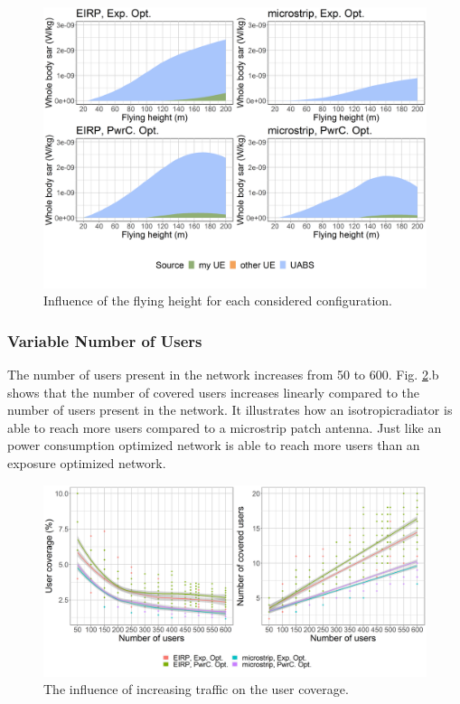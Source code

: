 \documentclass[twocolumn]{phdsymp} %
\begin{document}
\begin{figure}[h!]
\centering
  \includegraphics[width=\linewidth]{s2/fhFourSources.png}
  \caption{Influence of the flying height for each considered configuration.
  }
  \label{fig:s2shfourSourcesMatrix}
\end{figure}

\FloatBarrier
\subsubsection{Variable Number of Users}
The number of users present in the network increases from 50 to 600. Fig. \ref{fig:s2uvsnumcovusers}.b
shows that the number of covered users increases linearly compared to the number of users present in the network.
It illustrates how an \gls{isotropicradiator} is able to reach more users 
compared to a microstrip patch antenna. Just like an power consumption optimized network 
is able to reach more users than an exposure optimized network.
\begin{figure}[h!]
  \includegraphics[width=\linewidth]{s2/uvsnumdronesAndCov.png}
  \caption{The influence of increasing traffic on the user coverage.}
  \label{fig:s2uvsnumcovusers}
\end{figure}
\end{document}
